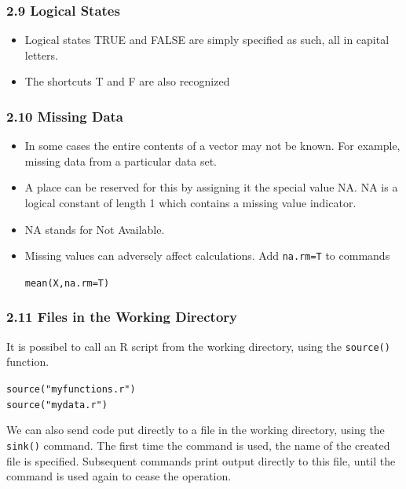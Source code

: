 \documentclass{beamer}
\begin{document}
 	\begin{frame} 
 		\frametitle{2.9 Logical States}
 		\begin{itemize}
 			\item Logical states TRUE and FALSE are simply specified as such, all in capital letters. 
 			\item The
 			shortcuts T and F are also recognized
 		\end{itemize}
 	\end{frame}
 	\begin{frame}
 		\frametitle{2.10 Missing Data}
 		\begin{itemize}
 			\item In some cases the entire contents of a vector may not be known. For example, missing data
 			from a particular data set. \item A place can be reserved for this by assigning it the special value
 			NA.
 			NA is a logical constant of length 1 which contains a missing value indicator.
 			\item  NA stands
 			for Not Available.
 			\item Missing values can adversely affect calculations. Add \texttt{na.rm=T} to commands
 			
 			\begin{framed}
 			\texttt{mean(X,na.rm=T)}
 			\end{framed}
 		\end{itemize}
 	\end{frame}
 	\begin{frame}
 		
 		\frametitle{2.11 Files in the Working Directory}
 		It is possibel to call an R script from the working directory, using the \texttt{source()} function.
 		\begin{framed}
 			
 			\texttt{source("myfunctions.r")\\
 				source("mydata.r")}
 			
 		\end{framed} 
 		We can also send code put directly to a file in the working directory, using the \texttt{sink()}
 		command. The first time the command is used, the name of the created file is specified.
 		Subsequent commands print output directly to this file, until the command is used again to
 		cease the operation.
 	\end{frame}
\end{document}
